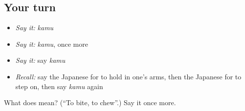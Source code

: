 \subsection*{Your turn}
\begin{itemize}
\raggedright
  \item \emph{Say it:} \emph{kamu}
  \item \emph{Say it:} \emph{kamu}, once more
  \item \emph{Say it:} say \emph{kamu}
  \item \emph{Recall:} say the Japanese for to hold in one's arms, then the Japanese for to step on, then say \emph{kamu} again
\end{itemize}

\begin{tcolorbox}[breakable,colback=teal!4,colframe=teal!35!black,title={Before you move on}]
What does  mean? (\textquotedblleft{}To bite, to chew\textquotedblright{}.) Say it once more.
\end{tcolorbox}
